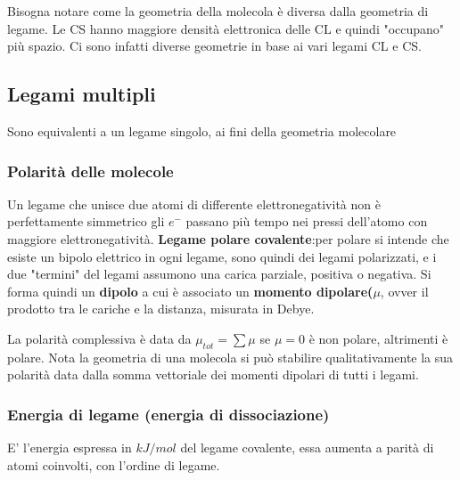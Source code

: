 

Bisogna notare come la geometria della molecola è diversa dalla geometria di legame. Le CS hanno maggiore densità elettronica delle CL e quindi "occupano" più spazio. Ci sono infatti diverse geometrie in base ai vari legami CL e CS. 


\subsection{Legami multipli}
Sono equivalenti a un legame singolo, ai fini della geometria molecolare
\subsubsection{Polarità delle molecole}
Un legame che unisce due atomi di differente elettronegatività non è perfettamente simmetrico gli $e^{-}$ passano più tempo nei pressi dell'atomo con maggiore elettronegatività. 
\textbf{Legame polare covalente}:per polare si intende che esiste un bipolo elettrico in ogni legame, sono quindi dei legami polarizzati, e i due "termini" del legami assumono una carica parziale, positiva o negativa. Si forma quindi un \textbf{dipolo} a cui è associato un \textbf{momento dipolare($\mu$}, ovver il prodotto tra le cariche e la distanza, misurata in Debye. 

La polarità complessiva è data da $\mu_{tot}=\sum \mu$ se $\mu=0$ è non polare, altrimenti è polare. Nota la geometria di una molecola si può stabilire qualitativamente la sua polarità data dalla somma vettoriale dei momenti dipolari di tutti i legami. 


\subsubsection{Energia di legame (energia di dissociazione)}
E' l'energia espressa in $kJ/mol$ del legame covalente, essa aumenta a parità di atomi coinvolti, con l'ordine di legame. 